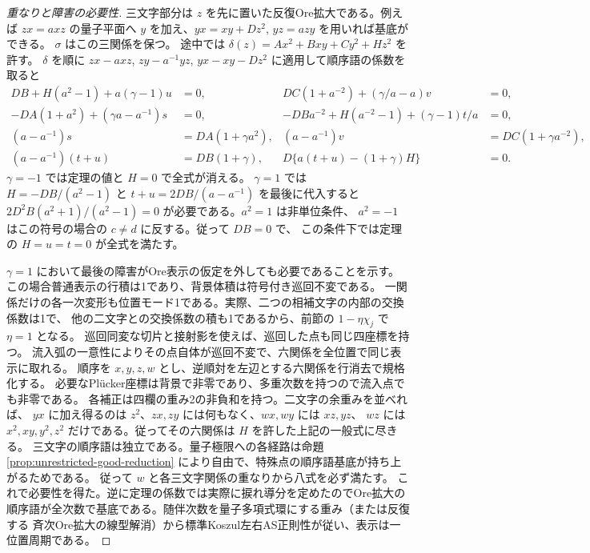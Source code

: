 \begin{proof}[重なりと障害の必要性]
三文字部分は $z$ を先に置いた反復Ore拡大である。例えば $zx=a xz$ の量子平面へ
$y$ を加え、$yx=xy+D z^2$, $yz=a zy$ を用いれば基底ができる。
$\sigma$ はこの三関係を保つ。
途中では $\delta(z)=Ax^2+Bxy+Cy^2+H z^2$ を許す。
$\delta$ を順に $zx-a xz$, $zy-a^{-1}yz$, $yx-xy-Dz^2$ に適用して順序語の係数を取ると
\begin{align*}
 DB+H(a^2-1)+a(\gamma-1)u&=0,& DC(1+a^{-2})+(\gamma/a-a)v&=0,\\
 -DA(1+a^2)+(\gamma a-a^{-1})s&=0,&-DBa^{-2}+H(a^{-2}-1)+(\gamma-1)t/a&=0,\\
 (a-a^{-1})s&=DA(1+\gamma a^2),&(a-a^{-1})v&=DC(1+\gamma a^{-2}),\\
 (a-a^{-1})(t+u)&=DB(1+\gamma),&D\{a(t+u)-(1+\gamma)H\}&=0 .
\end{align*}
$\gamma=-1$ では定理の値と $H=0$ で全式が消える。
$\gamma=1$ では $H=-DB/(a^2-1)$ と $t+u=2DB/(a-a^{-1})$ を最後に代入すると
$2D^2B(a^2+1)/(a^2-1)=0$ が必要である。$a^2=1$ は非単位条件、
$a^2=-1$ はこの符号の場合の $c\ne d$ に反する。従って $DB=0$ で、
この条件下では定理の $H=u=t=0$ が全式を満たす。

$\gamma=1$ において最後の障害がOre表示の仮定を外しても必要であることを示す。
この場合普通表示の行積は1であり、背景体積は符号付き巡回不変である。
一関係だけの各一次変形も位置モード1である。実際、二つの相補文字の内部の交換係数は1で、
他の二文字との交換係数の積も1であるから、前節の $1-\eta\chi_j$ で $\eta=1$ となる。
巡回同変な切片と接射影を使えば、巡回した点も同じ四座標を持つ。
流入弧の一意性によりその点自体が巡回不変で、六関係を全位置で同じ表示に取れる。
順序を $x,y,z,w$ とし、逆順対を左辺とする六関係を行消去で規格化する。
必要なPlücker座標は背景で非零であり、多重次数を持つので流入点でも非零である。
各補正は四欄の重み2の非負和を持つ。二文字の余重みを並べれば、
$yx$ に加え得るのは $z^2$、$zx,zy$ には何もなく、$wx,wy$ には $xz,yz$、
$wz$ には $x^2,xy,y^2,z^2$ だけである。従ってその六関係は $H$ を許した上記の一般式に尽きる。
三文字の順序語は独立である。量子極限への各経路は命題\ref{prop:unrestricted-good-reduction}
により自由で、特殊点の順序語基底が持ち上がるためである。
従って $w$ と各三文字関係の重なりから八式を必ず満たす。
これで必要性を得た。逆に定理の係数では実際に捩れ導分を定めたのでOre拡大の
順序語が全次数で基底である。随伴次数を量子多項式環にする重み（または反復する
斉次Ore拡大の線型解消）から標準Koszul左右AS正則性が従い、表示は一位置周期である。
\end{proof}


